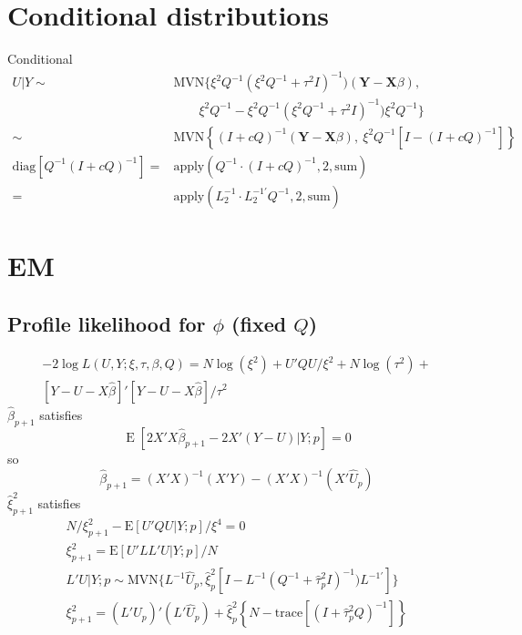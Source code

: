 \documentclass[12pt]{article}
\DeclareMathOperator{\E}{E}
\begin{document}
\section*{Conditional distributions}
Conditional
\begin{align*}
U|Y \sim & \text{MVN}\{\xi^2Q^{-1}(\xi^2 Q^{-1} + \tau^2 I)^{-1})
(\mathbf{Y} - \mathbf{X}\beta), \\
&\qquad
\xi^2Q^{-1}- \xi^2Q^{-1}( \xi^2Q^{-1} + \tau^2 I  )^{-1})\xi^2 Q^{-1} \}\\
\sim &\text{MVN}\left\{  ( I + c Q  )^{-1}  (\mathbf{Y} -
\mathbf{X}\beta),\ \xi^2 Q^{-1}[I- ( I + cQ  )^{-1}	 ] \right\}\\
\text{diag}\left[Q^{-1} ( I + c Q  )^{-1}\right]	= &
\text{apply}(Q^{-1} \cdot
( I + c Q  )^{-1}, 2,\text{sum})\\
= & \text{apply}(L_2^{-1}\cdot L_2^{-1\prime}Q^{-1},2,\text{sum})
\end{align*}

\section*{EM}

\subsection*{Profile likelihood for $\phi$ (fixed $Q$)}
\begin{multline*}
-2 \log L(U,Y;\xi,\tau,\beta,Q) =
	N\log(\xi^2) + U'Q U/\xi^2 +
	N\log(\tau^2) +\\
	[Y-U-X\hat\beta]'[Y-U-X\hat\beta]/\tau^2
	\end{multline*}
$\hat\beta_{p+1}$ satisfies
\[
\E[ 2  X' X \hat\beta_{p+1} - 2 X'(Y - U) |Y ; p] = 0
 \]
 so
\[
 \hat\beta_{p+1} = (X'X)^{-1}(X'Y) - (X'X)^{-1}(X'\hat U_p)
\]
$\hat\xi^2_{p+1}$ satisfies
\begin{gather*}
N/\xi^2_{p+1} - \text{E}[ U'Q U |Y; p ]/\xi^4 = 0\\
\xi^2_{p+1} = \text{E}[ U'L L' U |Y; p ]/N\\
L'U|Y;p \sim  \text{MVN}\{
	L^{-1}\hat U_p,
\hat\xi_p^2[I - L^{-1}( Q^{-1} + \hat\tau_p^2 I  )^{-1}) L^{-1\prime}] \}\\
\xi^2_{p+1} = (L' \hat U_p )'(L'\hat U_p) + \hat\xi_p^2\left\{N-
\text{trace}\left[(I + \hat\tau_p^2 Q  )^{-1} \right]\right\}
\end{gather*}
\end{document}
